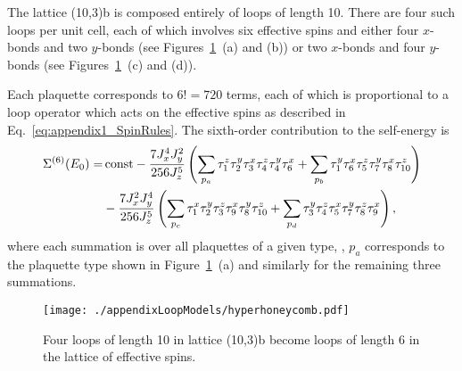 The lattice (10,3)b is composed entirely of loops of length 10.
There are four such loops per unit cell, each of which involves six effective spins and either four $x$-bonds and two $y$-bonds (see Figures~\ref{fig:appendix1_10_3b}~(a) and (b)) or two $x$-bonds and four $y$-bonds (see Figures~\ref{fig:appendix1_10_3b}~(c) and (d)).

Each plaquette corresponds to $6! = 720$ terms, each of which is proportional to a loop operator which acts on the effective spins as described in Eq.~\eqref{eq:appendix1_SpinRules}.
The sixth-order contribution to the self-energy is
%
\begin{align}
	\Sigma^{(6)}(E_0) = &{\,\rm const} - \frac{7 J_x^4 J_y^2}{256 J_z^5} \left( \sum_{p_a} \tau_1^z \tau_2^y \tau_3^x \tau_4^z \tau_4^y \tau_6^x + \sum_{p_b} \tau_1^y \tau_6^x \tau_5^z \tau_7^y \tau_8^x \tau_{10}^z \right) \nonumber\\
	&- \frac{7 J_x^2 J_y^4}{256 J_z^5} \left( \sum_{p_c} \tau_1^x \tau_2^y \tau_3^z \tau_9^x \tau_8^y \tau_{10}^z + \sum_{p_d} \tau_3^y \tau_4^z \tau_5^x \tau_7^y \tau_8^z \tau_9^x \right),
\end{align}
%
where each summation is over all plaquettes of a given type, \ie, $p_a$ corresponds to the plaquette type shown in Figure~\ref{fig:appendix1_10_3b}~(a) and similarly for the remaining three summations.
%
\begin{figure}[tb]
	\centering
	\texttt{[image: ./appendixLoopModels/hyperhoneycomb.pdf]}
	\caption{Four loops of length 10 in lattice (10,3)b become loops of length 6 in the lattice of effective spins.}
	\label{fig:appendix1_10_3b}
\end{figure}
%

